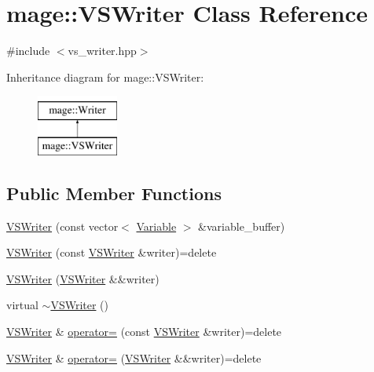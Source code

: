 \hypertarget{classmage_1_1_v_s_writer}{}\section{mage\+:\+:V\+S\+Writer Class Reference}
\label{classmage_1_1_v_s_writer}


{\ttfamily \#include $<$vs\+\_\+writer.\+hpp$>$}

Inheritance diagram for mage\+:\+:V\+S\+Writer\+:\begin{figure}[H]
\begin{center}
\leavevmode
\includegraphics[height=2.000000cm]{classmage_1_1_v_s_writer}
\end{center}
\end{figure}
\subsection*{Public Member Functions}
\begin{DoxyCompactItemize}
\item 
\hyperlink{classmage_1_1_v_s_writer_ac1a9ff905a94e9c89a7ed48dc7c4b629}{V\+S\+Writer} (const vector$<$ \hyperlink{structmage_1_1_variable}{Variable} $>$ \&variable\+\_\+buffer)
\item 
\hyperlink{classmage_1_1_v_s_writer_a77d146f812d9d37ee99c31133d3597b8}{V\+S\+Writer} (const \hyperlink{classmage_1_1_v_s_writer}{V\+S\+Writer} \&writer)=delete
\item 
\hyperlink{classmage_1_1_v_s_writer_a744553658a13bbe59349058579fafb56}{V\+S\+Writer} (\hyperlink{classmage_1_1_v_s_writer}{V\+S\+Writer} \&\&writer)
\item 
virtual \hyperlink{classmage_1_1_v_s_writer_aa15508560fbef2ef742beb1ff0d96d19}{$\sim$\+V\+S\+Writer} ()
\item 
\hyperlink{classmage_1_1_v_s_writer}{V\+S\+Writer} \& \hyperlink{classmage_1_1_v_s_writer_af943d317ae357723a08b2bbf2bab23ba}{operator=} (const \hyperlink{classmage_1_1_v_s_writer}{V\+S\+Writer} \&writer)=delete
\item 
\hyperlink{classmage_1_1_v_s_writer}{V\+S\+Writer} \& \hyperlink{classmage_1_1_v_s_writer_af1dca5c791cfb62967cd2437f7db170a}{operator=} (\hyperlink{classmage_1_1_v_s_writer}{V\+S\+Writer} \&\&writer)=delete
\end{DoxyCompactItemize}
